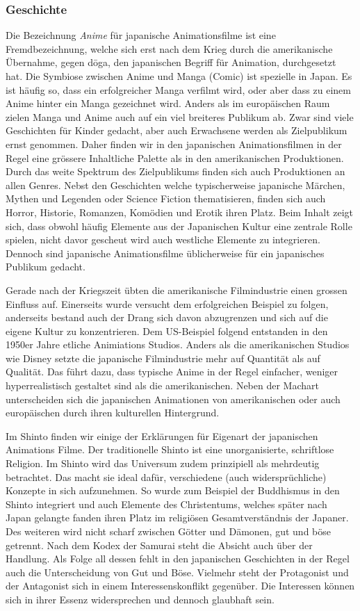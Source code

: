 \subsubsection{Geschichte}
Die Bezeichnung \emph{Anime} für japanische Animationsfilme ist eine Fremdbezeichnung, welche sich erst nach dem Krieg durch die amerikanische Übernahme, gegen d\={o}ga, den japanischen Begriff für Animation, durchgesetzt hat. Die Symbiose zwischen Anime und Manga (Comic) ist spezielle in Japan. Es ist häufig so, dass ein erfolgreicher Manga verfilmt wird, oder aber dass zu einem Anime hinter ein Manga gezeichnet wird. Anders als im europäischen Raum zielen Manga und Anime auch auf ein viel breiteres Publikum ab. Zwar sind viele Geschichten für Kinder gedacht, aber auch Erwachsene werden als Zielpublikum ernst genommen. Daher finden wir in den japanischen Animationsfilmen in der Regel eine grössere Inhaltliche Palette als in den amerikanischen Produktionen. Durch das weite Spektrum des Zielpublikums finden sich auch Produktionen an allen Genres. Nebst den Geschichten welche typischerweise japanische Märchen, Mythen und Legenden oder Science Fiction thematisieren, finden sich auch Horror, Historie, Romanzen, Komödien und Erotik ihren Platz. Beim Inhalt zeigt sich, dass obwohl häufig Elemente aus der Japanischen Kultur eine zentrale Rolle spielen, nicht davor gescheut wird auch westliche Elemente zu integrieren. Dennoch sind japanische Animationsfilme üblicherweise für ein japanisches Publikum gedacht.

Gerade nach der Kriegszeit übten die amerikanische Filmindustrie einen grossen Einfluss auf. Einerseits wurde versucht dem erfolgreichen Beispiel zu folgen, anderseits bestand auch der Drang sich davon abzugrenzen und sich auf die eigene Kultur zu konzentrieren. Dem US-Beispiel folgend entstanden in den 1950er Jahre etliche Animiations Studios. Anders als die amerikanischen Studios wie Disney setzte die japanische Filmindustrie mehr auf Quantität als auf Qualität. Das führt dazu, dass typische Anime in der Regel einfacher, weniger hyperrealistisch gestaltet sind als die amerikanischen. Neben der Machart unterscheiden sich die japanischen Animationen von amerikanischen oder auch europäischen durch ihren kulturellen Hintergrund. 

Im Shinto finden wir einige der Erklärungen für Eigenart der japanischen Animations Filme. Der traditionelle Shinto ist eine unorganisierte, schriftlose Religion. Im Shinto wird das Universum zudem prinzipiell als mehrdeutig betrachtet. Das macht sie ideal dafür, verschiedene (auch widersprüchliche) Konzepte in sich aufzunehmen. So wurde zum Beispiel der Buddhismus in den Shinto integriert und auch Elemente des Christentums, welches später nach Japan gelangte fanden ihren Platz im religiösen Gesamtverständnis der Japaner. Des weiteren wird nicht scharf zwischen Götter und Dämonen, gut und böse getrennt. Nach dem Kodex der Samurai steht die Absicht auch über der Handlung. Als Folge all dessen fehlt in den japanischen Geschichten in der Regel auch die Unterscheidung von Gut und Böse. Vielmehr steht der Protagonist und der Antagonist sich in einem Interessenskonflikt gegenüber. Die Interessen können sich in ihrer Essenz widersprechen und dennoch glaubhaft sein. 

